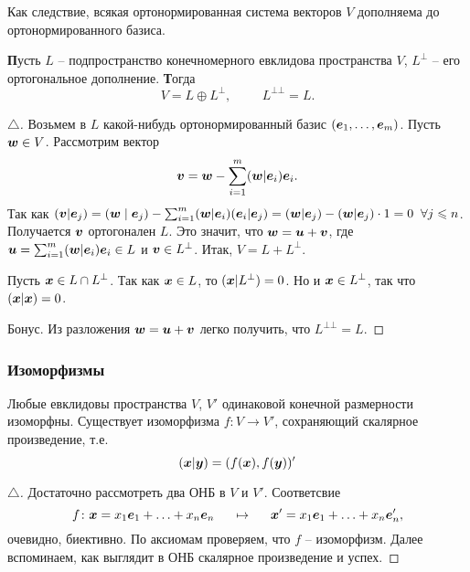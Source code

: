 Как следствие, всякая ортонормированная система векторов $V$ дополняема до ортонормированного базиса.


\begin{to_thr}
    \textbf{П}усть $L$ -- подпространство конечномерного евклидова пространства $V$, $L^{\bot}$ -- его ортогональное дополнение. \textbf{Т}огда 
    \begin{equation}
        V = L \oplus L^{\bot}, \hspace{1cm} L^{\bot \bot} = L.
    \end{equation}
\end{to_thr}

\begin{proof}[$\triangle$]
    Возьмем в $L$ какой-нибудь ортонормированный базис $(\mbox{\boldmath $e$}_{1}, \ldots, \mbox{\boldmath $e$}_m)$. Пусть $\mbox{\boldmath $w$} \in V$. Рассмотрим вектор
    $$
        \mbox{\boldmath $v$} = \mbox{\boldmath $w$} - \sum_{i=1}^m (\mbox{\boldmath $w$} | \mbox{\boldmath $e$}_i) \mbox{\boldmath $e$}_i.
    $$
    Так как $(\mbox{\boldmath $v$} | \mbox{\boldmath $e$}_j) = (\mbox{\boldmath $w$} \mid \mbox{\boldmath $e$}_j) - \sum_{i=1}^{m} (\mbox{\boldmath $w$} | \mbox{\boldmath $e$}_i) (\mbox{\boldmath $e$}_i | \mbox{\boldmath $e$}_j) = (\mbox{\boldmath $w$} | \mbox{\boldmath $e$}_j)  - (\mbox{\boldmath $w$} | \mbox{\boldmath $e$}_j) \cdot 1 = 0\; \; \forall j \leqslant n$. Получается $\mbox{\boldmath $v$}$ ортогонален $L$. Это значит, что $\mbox{\boldmath $w$} = \mbox{\boldmath $u$} + \mbox{\boldmath $v$}$, где $\mbox{\boldmath $u$} = \sum_{i=1}^{m} (\mbox{\boldmath $w$} | \mbox{\boldmath $e$}_i) \mbox{\boldmath $e$}_i \in L$ и $\mbox{\boldmath $v$} \in L^{\bot}$. Итак, $V = L + L^{\bot}$. 

    Пусть $\mbox{\boldmath $x$} \in L \cap L^{\bot}$. Так как $\mbox{\boldmath $x$} \in L$, то $(\mbox{\boldmath $x$} | L^{\bot})=0$. Но и $\mbox{\boldmath $x$} \in L^{\bot}$, так что $(\mbox{\boldmath $x$} | \mbox{\boldmath $x$}) = 0$.

    Бонус. Из разложения $\mbox{\boldmath $w$} = \mbox{\boldmath $u$} + \mbox{\boldmath $v$}$ легко получить, что $L^{\bot \bot} = L$. 
\end{proof}


\subsubsection{Изоморфизмы}

\begin{to_thr}
    Любые евклидовы пространства $V$, $V'$ одинаковой конечной размерности изоморфны. Существует изоморфизма $f \colon V \to V'$, сохраняющий скалярное произведение, т.е.
    \begin{equation}
        (\mbox{\boldmath $x$} | \mbox{\boldmath $y$}) = (f(\mbox{\boldmath $x$}), f(\mbox{\boldmath $y$}))'
    \end{equation}
\end{to_thr}

\begin{proof}[$\triangle$]
    Достаточно рассмотреть два ОНБ в $V$ и $V'$. 
    Соответсвие
    $$
        f \colon \mbox{\boldmath $x$} = x_{1} \mbox{\boldmath $e$}_{1} + \ldots  + x_n \mbox{\boldmath $e$}_n 
        \hspace{0.5cm} \mapsto \hspace{0.5cm}
        \mbox{\boldmath $x$}' = x_{1} \mbox{\boldmath $e$}_{1} + \ldots + x_n \mbox{\boldmath $e$}_n',
    $$
    очевидно, биективно. По аксиомам проверяем, что $f$ -- изоморфизм. Далее вспоминаем, как выглядит в ОНБ скалярное произведение и успех.
\end{proof}


